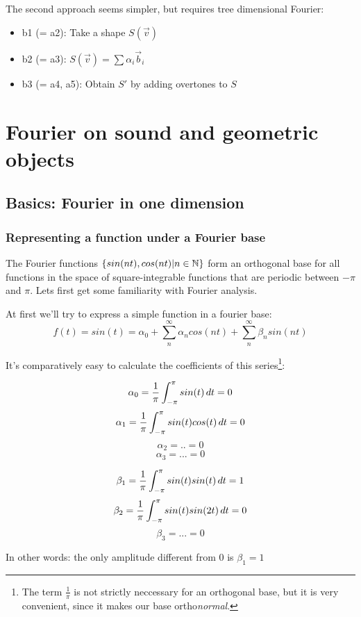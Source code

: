 The second approach seems simpler, but requires tree dimensional Fourier: 
\begin{itemize}
    \item b1 (= a2): Take a shape $S(\vec{v})$
    \item b2 (= a3): $S(\vec{v}) = \sum \alpha_i \vec{b}_i$
    \item b3 (= a4, a5): Obtain $S'$ by adding overtones to $S$
\end{itemize}






\section{Fourier on sound and geometric objects}

\subsection{Basics: Fourier in one dimension}

\subsubsection{Representing a function under a Fourier base}

 The Fourier functions $\{sin(nt), cos(nt) | n \in \mathbb{N} \}$ form an orthogonal base for all functions in the space of square-integrable functions that are periodic between $-\pi$ and $\pi$. Lets first get some familiarity with Fourier analysis.

At first we'll try to express a simple function in a fourier base: 
$$ f(t) = sin(t) = \alpha_0 + \sum_n^\infty \alpha_n cos(n t)  + \sum_n^\infty \beta_n sin(n t)$$

It's comparatively easy to calculate the coefficients of this series\footnote{The term $\frac{1}{\pi}$ is not strictly neccessary for an orthogonal base, but it is very convenient, since it makes our base ortho\emph{normal}.}: 

$$ \alpha_0 = \frac{1}{\pi} \int_{-\pi}^\pi sin(t) \mathop{dt} = 0$$
$$ \alpha_1 = \frac{1}{\pi} \int_{-\pi}^\pi sin(t) cos(t) \mathop{dt} = 0$$
$$ \alpha_2 = .. = 0 $$
$$ \alpha_3 = ... = 0 $$

$$ \beta_1 = \frac{1}{\pi} \int_{-\pi}^\pi sin(t) sin(t) \mathop{dt} = 1 $$
$$ \beta_2 = \frac{1}{\pi} \int_{-\pi}^\pi sin(t) sin(2t) \mathop{dt} = 0 $$
$$ \beta_3 = ... = 0 $$ 

In other words: the only amplitude different from $0$ is $\beta_1 = 1$

